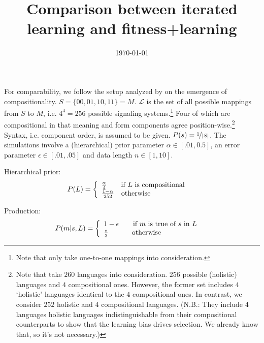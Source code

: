\documentclass[12pt]{article}
\begin{document}
\title{Comparison between iterated learning and fitness+learning}
\date{\today}

\maketitle

For comparability, we follow the setup analyzed by \citet[\S 6]{griffiths+kalish:2007} on the emergence of compositionality. $S = \{00,01,10,11\} = M$. $\mathcal{L}$ is the set of all possible mappings from $S$ to $M$, i.e. $4^4 = 256$ possible signaling systems.\footnote{Note that \citet{griffiths+kalish:2007} only take one-to-one mappings into consideration.} Four of which are compositional in that meaning and form components agree position-wise.\footnote{Note that \citet{griffiths+kalish:2007} take $260$ languages into consideration. $256$ possible (holistic) languages and $4$ compositional ones. However, the former set includes $4$ `holistic' languages identical to the $4$ compositional ones. In contrast, we consider $252$ holistic and $4$ compositional languages. (N.B.: They include 4 languages holistic languages indistinguishable from their compositional counterparts to show that the learning bias drives selection. We already know that, so it's not necessary.)} Syntax, i.e. component order, is assumed to be given. $P(s) = \nicefrac{1}{|S|}$. The simulations involve a (hierarchical) prior parameter $\alpha \in [.01,0.5]$, an error parameter $\epsilon \in [.01,.05]$ and data length $n \in [1,10]$.
\vspace{1cm}

Hierarchical prior:
\begin{align}
P(L) &= \left\{\begin{array}{l} \frac{\alpha}{4} \qquad \textnormal{if $L$ is compositional}\\
\frac{1 - \alpha}{252} \quad \textnormal{otherwise}\end{array}\right.
\end{align}

Production: 
\begin{align}
P(m|s,L) &= \left\{\begin{array}{l} 1 - \epsilon \qquad \textnormal{if $m$ is true of $s$ in $L$}\\
\frac{\epsilon}{3} \quad \  \qquad \textnormal{otherwise}\end{array}\right.
\end{align}
\end{document}
